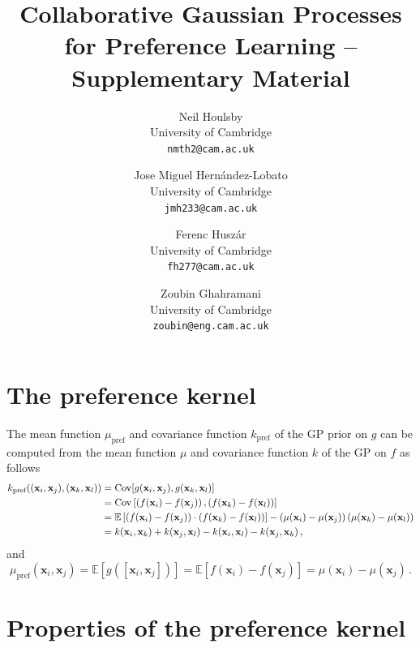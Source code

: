 \documentclass{article}
\newcommand{\x}{\mathbf{x}}
\begin{document}
\title{Collaborative Gaussian Processes for Preference Learning -- Supplementary Material}

\date{}

\author{ Neil Houlsby \\ University of Cambridge  \\ \texttt{nmth2@cam.ac.uk} \and Jose Miguel Hern\'{a}ndez-Lobato \\ University of Cambridge \\ \texttt{jmh233@cam.ac.uk} \and Ferenc Husz\'{a}r \\ University of Cambridge \\ \texttt{fh277@cam.ac.uk} \and Zoubin Ghahramani \\ University of Cambridge \\ \texttt{zoubin@eng.cam.ac.uk}}

\maketitle

\section{The preference kernel}

The mean function $\mu_\text{pref}$ and covariance function $k_\text{pref}$ of the GP prior on $g$ can be computed from the mean
function $\mu$ and covariance function $k$ of the GP on $f$ as follows
\begin{align}
k_\text{pref}((\x_i,\x_j),(\x_k,\x_l)) &= \mathrm{Cov}[g(\x_i,\x_j),g(\x_k,\x_l)]\notag\\
&= \mathrm{Cov}\left[\left(f(\x_i) - f(\x_j)\right) , \left(f(\x_k)  - f(\x_l)\right)\right]\notag\\
&= \mathbb{E}\left[\left(f(\x_i) - f(\x_j)\right)\cdot \left(f(\x_k) - f(\x_l)\right)\right] \notag -
\left(\mu(\x_i) -  \mu(\x_j)\right) \left(\mu(\x_k) - \mu(\x_l)\right)\notag\\
&= k(\x_i,\x_k) + k(\x_j,\x_l) - k(\x_i,\x_l) - k(\x_j,\x_k)\,,
\end{align}
and
\begin{equation}
\mu_\text{pref}(\x_i,\x_j) = \mathbb{E}\left[g([\x_i,\x_j])\right] = \mathbb{E}\left[f(\x_i) - f(\x_j)\right] = \mu(\x_i) - \mu(\x_j)\,.
\end{equation}

\section{Properties of the preference kernel}
\end{document}

